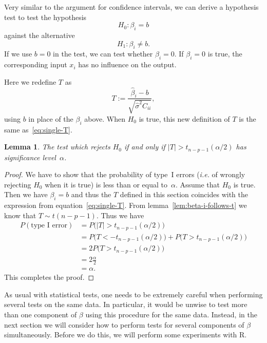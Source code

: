 \documentclass[
  a4paper,
]{article}
\newtheorem{lemma}{Lemma}[section]
\theoremstyle{definition}
\theoremstyle{definition}
\theoremstyle{definition}
\theoremstyle{definition}
\theoremstyle{remark}
\begin{document}
Very similar to the argument for confidence intervals, we can
derive a hypothesis test to test the hypothesis
\begin{equation*}
  H_0\colon \beta_i = b
\end{equation*}
against the alternative
\begin{equation*}
  H_1\colon \beta_i \neq b.
\end{equation*}
If we use \(b = 0\) in the test, we can test whether \(\beta_i = 0\).
If \(\beta_i = 0\) is true, the corresponding input \(x_i\) has no influence
on the output.

Here we redefine \(T\) as
\begin{equation}
  T
  := \frac{\hat\beta_i - b}{\sqrt{\hat\sigma^2 C_{ii}}},  \label{eq:single-test}
\end{equation}
using \(b\) in place of the \(\beta_i\) above. When \(H_0\) is true, this new
definition of \(T\) is the same as~\eqref{eq:single-T}.

\begin{lemma}
\protect\hypertarget{lem:t-test}{}\label{lem:t-test}The test which rejects \(H_0\) if and only if \(|T| > t_{n-p-1}(\alpha/2)\)
has significance level~\(\alpha\).
\end{lemma}

\begin{proof}
We have to show that the probability of type~I errors (\emph{i.e.} of wrongly
rejecting \(H_0\) when it is true) is less than or equal to~\(\alpha\).
Assume that \(H_0\) is true. Then we have \(\beta_i = b\) and thus
the \(T\) defined in this section coincides with the expression from
equation~\eqref{eq:single-T}. From lemma~\ref{lem:beta-i-follows-t}
we know that \(T \sim t(n-p-1)\). Thus we have
\begin{align*}
  P( \mbox{type I error} )
  &= P\bigl( |T| > t_{n-p-1}(\alpha/2) \bigr) \\
  &= P\bigl(T < -t_{n-p-1}(\alpha/2) \bigr) + P\bigl(T > t_{n-p-1}(\alpha/2) \bigr) \\
  &= 2 P\bigl(T > t_{n-p-1}(\alpha/2) \bigr) \\
  &= 2 \frac{\alpha}{2} \\
  &= \alpha.
\end{align*}
This completes the proof.
\end{proof}

As usual with statistical tests, one needs to be extremely careful when
performing several tests on the same data. In particular, it would be
unwise to test more than one component of \(\beta\) using this procedure
for the same data. Instead, in the next section we will consider how
to perform tests for several components of \(\beta\) simultaneously.
Before we do this, we will perform some experiments with R.
\end{document}
